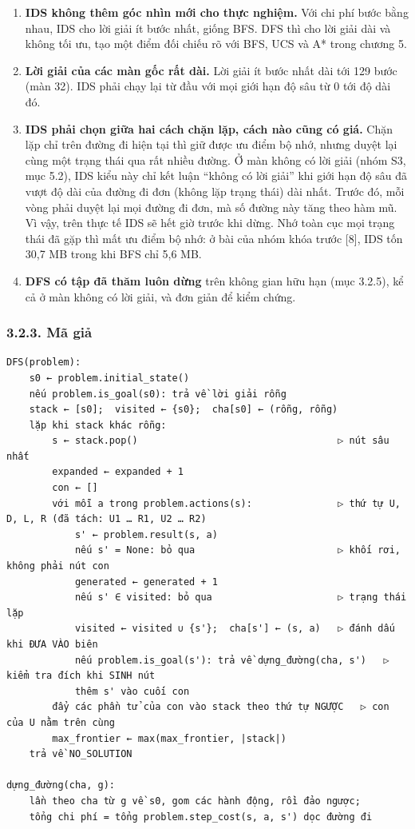 \begin{enumerate}
\def\labelenumi{\arabic{enumi}.}
\tightlist
\item
  \textbf{IDS không thêm góc nhìn mới cho thực nghiệm.} Với chi phí bước bằng nhau, IDS cho lời giải ít bước nhất, giống BFS. DFS thì cho lời giải dài và không tối ưu, tạo một điểm đối chiếu rõ với BFS, UCS và A* trong chương 5.
\item
  \textbf{Lời giải của các màn gốc rất dài.} Lời giải ít bước nhất dài tới 129 bước (màn 32). IDS phải chạy lại từ đầu với mọi giới hạn độ sâu từ 0 tới độ dài đó.
\item
  \textbf{IDS phải chọn giữa hai cách chặn lặp, cách nào cũng có giá.} Chặn lặp chỉ trên đường đi hiện tại thì giữ được ưu điểm bộ nhớ, nhưng duyệt lại cùng một trạng thái qua rất nhiều đường. Ở màn không có lời giải (nhóm S3, mục 5.2), IDS kiểu này chỉ kết luận ``không có lời giải'' khi giới hạn độ sâu đã vượt độ dài của đường đi đơn (không lặp trạng thái) dài nhất. Trước đó, mỗi vòng phải duyệt lại mọi đường đi đơn, mà số đường này tăng theo hàm mũ. Vì vậy, trên thực tế IDS sẽ hết giờ trước khi dừng. Nhớ toàn cục mọi trạng thái đã gặp thì mất ưu điểm bộ nhớ: ở bài của nhóm khóa trước {[}8{]}, IDS tốn 30,7 MB trong khi BFS chỉ 5,6 MB.
\item
  \textbf{DFS có tập đã thăm luôn dừng} trên không gian hữu hạn (mục 3.2.5), kể cả ở màn không có lời giải, và đơn giản để kiểm chứng.
\end{enumerate}

\subsubsection{3.2.3. Mã giả}

\begin{verbatim}
DFS(problem):
    s0 ← problem.initial_state()
    nếu problem.is_goal(s0): trả về lời giải rỗng
    stack ← [s0];  visited ← {s0};  cha[s0] ← (rỗng, rỗng)
    lặp khi stack khác rỗng:
        s ← stack.pop()                                   ▷ nút sâu nhất
        expanded ← expanded + 1
        con ← []
        với mỗi a trong problem.actions(s):               ▷ thứ tự U, D, L, R (đã tách: U1 … R1, U2 … R2)
            s' ← problem.result(s, a)
            nếu s' = None: bỏ qua                         ▷ khối rơi, không phải nút con
            generated ← generated + 1
            nếu s' ∈ visited: bỏ qua                      ▷ trạng thái lặp
            visited ← visited ∪ {s'};  cha[s'] ← (s, a)   ▷ đánh dấu khi ĐƯA VÀO biên
            nếu problem.is_goal(s'): trả về dựng_đường(cha, s')   ▷ kiểm tra đích khi SINH nút
            thêm s' vào cuối con
        đẩy các phần tử của con vào stack theo thứ tự NGƯỢC   ▷ con của U nằm trên cùng
        max_frontier ← max(max_frontier, |stack|)
    trả về NO_SOLUTION

dựng_đường(cha, g):
    lần theo cha từ g về s0, gom các hành động, rồi đảo ngược;
    tổng chi phí = tổng problem.step_cost(s, a, s') dọc đường đi
\end{verbatim}

